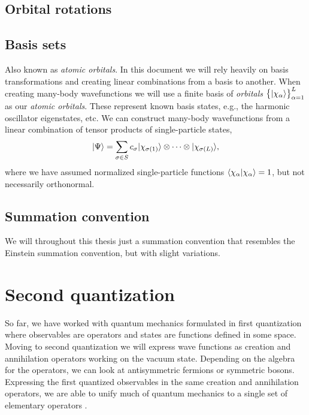         \subsection{Orbital rotations}

        \subsection{Basis sets}
            Also known as \emph{atomic orbitals}.
            In this document we will rely heavily on basis transformations and
            creating linear combinations from a basis to another. When creating
            many-body wavefunctions we will use a finite basis of \emph{orbitals}
            $\left\{ | \chi_{\alpha} \rangle \right\}_{\alpha = 1}^{L}$ as our \emph{atomic
            orbitals}. These represent known basis states, e.g., the harmonic
            oscillator eigenstates, etc. We can construct many-body wavefunctions
            from a linear combination of tensor products of single-particle states,
            \begin{align}
                | \Psi \rangle
                = \sum_{\sigma \in S} c_{\sigma}
                | \chi_{\sigma(1)} \rangle\otimes\dots\otimes| \chi_{\sigma(L)} \rangle,
            \end{align}
            where we have assumed normalized single-particle functions
            $\langle \chi_{\alpha} | \chi_{\alpha} \rangle = 1$, but not necessarily
            orthonormal.
        \subsection{Summation convention}
            We will throughout this thesis just a summation convention that
            resembles the Einstein summation convention, but with slight
            variations.


    \section{Second quantization}
        So far, we have worked with quantum mechanics formulated in first
        quantization where observables are operators and states are functions
        defined in some space.
        Moving to second quantization we will express wave functions as creation
        and annihilation operators working on the vacuum state.
        Depending on the algebra for the operators, we can look at antisymmetric
        fermions or symmetric bosons.
        Expressing the first quantized observables in the same creation and
        annihilation operators, we are able to unify much of quantum mechanics
        to a single set of elementary operators \cite{helgaker-molecular}.

